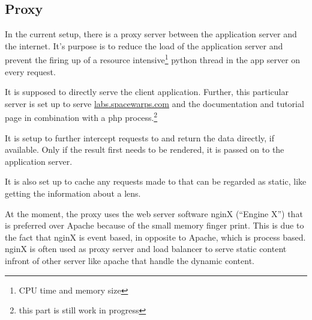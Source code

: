 \subsection{Proxy}
\label{sec:proxy}

In the current setup, there is a proxy server between the application server and the internet.
It's purpose is to reduce the load of the application server and prevent the firing up of a resource intensive\footnote{CPU time and memory size} python thread in the app server on every request.

It is supposed to directly serve the client application. Further, this particular server is set up to serve \url{labs.spacewarps.com} and the \spl documentation and tutorial page in combination with a php process.\footnote{this part is still work in progress}

It is setup to further intercept requests to  and return the data directly, if available.
Only if the result first needs to be rendered, it is passed on to the application server.

It is also set up to cache any requests made to  that can be regarded as static, like getting the information about a lens.

At the moment, the proxy uses the web server software nginX (``Engine X'') that is preferred over Apache because of the small memory finger print.
This is due to the fact that nginX is event based, in opposite to Apache, which is process based.
nginX is often used as proxy server and load balancer to serve static content infront of other server like apache that handle the dynamic content.



